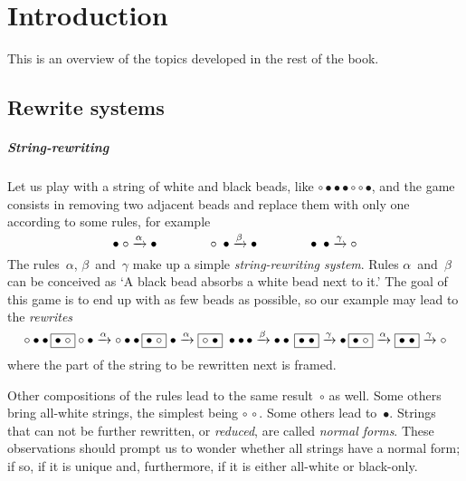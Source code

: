 \chapter{Introduction}
\setcounter{page}{1}

This is an overview of the topics developed in the rest of the book.

\section{Rewrite systems}

\paragraph{String-rewriting}

Let us play with a string of white and black beads, like \(\circ
\bullet \bullet \bullet \circ \circ \bullet\), and the game
\citep{VanLeeuwen_1990a,Dershowitz_1993} consists in removing two
adjacent beads and replace them with only one according to some rules,
for example
\begin{equation*}
\bullet \; \circ   \xrightarrow{\smash{\alpha}} \bullet\qquad\qquad
\circ   \; \bullet \xrightarrow{\smash{\beta}} \bullet\qquad\qquad
\bullet \; \bullet \xrightarrow{\smash{\gamma}} \circ
\end{equation*}
The rules~\(\alpha\), \(\beta\)~and~\(\gamma\) make up a simple
\emph{string\hyp{}rewriting system}. Rules
\(\alpha\)~and~\(\beta\) can be conceived as `A black bead absorbs
a white bead next to it.' The goal of this game is to end up with
as few beads as possible, so our example may lead to the
\emph{rewrites}
\begin{equation*}
\circ \bullet \bullet \, \fbox{\(\bullet\; \circ\)} \circ \bullet
\xrightarrow{\smash{\alpha}} \circ \bullet \bullet \,
\fbox{\(\bullet\; \circ\)} \; \bullet \xrightarrow{\smash{\alpha}}
\fbox{\(\circ \; \bullet\)} \; \bullet \bullet \,\bullet
\xrightarrow{\smash{\beta}} \bullet \bullet \, \fbox{\(\bullet \;
  \bullet\)} \xrightarrow{\smash{\gamma}} \bullet \, \fbox{\(\bullet
  \; \circ\)} \xrightarrow{\smash{\alpha}} \fbox{\(\bullet \;
  \bullet\)} \xrightarrow{\smash{\gamma}} \circ
\end{equation*}
where the part of the string to be rewritten next is framed.

Other compositions of the rules lead to the same result~\(\circ\) as
well. Some others bring all\hyp{}white strings, the simplest being
\(\circ \, \circ\). Some others lead to~\(\bullet\). Strings that can
not be further rewritten, or \emph{reduced}, are called \emph{normal
forms}. These observations should
prompt us to wonder whether all strings have a normal form; if so, if
it is unique and, furthermore, if it is either all\hyp{}white or
black\hyp{}only.


